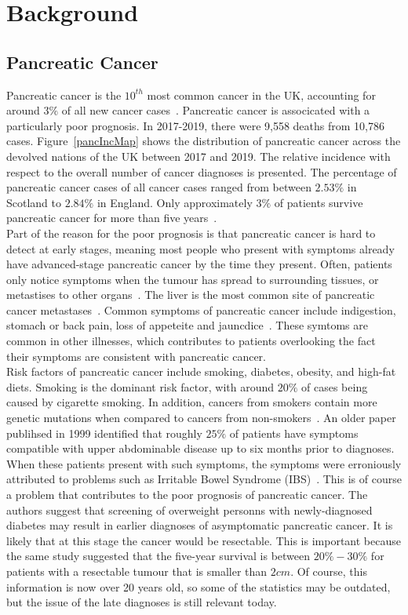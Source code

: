 \chapter{Background}\label{backChap}

\section{Pancreatic Cancer}
Pancreatic cancer is the $10^{th}$ most common cancer in the UK, accounting for around $3\%$ of all new cancer cases~\cite{pancStat}. Pancreatic cancer is associcated with a particularly poor prognosis. In 2017-2019, there were 9,558 deaths from 10,786 cases. Figure~\ref{pancIncMap} shows the distribution of pancreatic cancer across the devolved nations of the UK between 2017 and 2019. The relative incidence with respect to the overall number of cancer diagnoses is presented. The percentage of pancreatic cancer cases of all cancer cases ranged from between $2.53\%$ in Scotland to $2.84\%$ in England. Only approximately $3\%$ of patients survive pancreatic cancer for more than five years~\cite{NG85}.\\

Part of the reason for the poor prognosis is that pancreatic cancer is hard to detect at early stages, meaning most people who present with symptoms already have advanced-stage pancreatic cancer by the time they present. Often, patients only notice symptoms when the tumour has spread to surrounding tissues, or metastises to other organs~\cite{kelsen}. The liver is the most common site of pancreatic cancer metastases~\cite{deeb}. Common symptoms of pancreatic cancer include indigestion, stomach or back pain, loss of appeteite and jauncdice~\cite{pancSymp}. These symtoms are common in other illnesses, which contributes to patients overlooking the fact their symptoms are consistent with pancreatic cancer. \\

Risk factors of pancreatic cancer include smoking, diabetes, obesity, and high-fat diets. Smoking is the dominant risk factor, with around $20\%$ of cases being caused by cigarette smoking. In addition, cancers from smokers contain more genetic mutations when compared to cancers from non-smokers~\cite{blackford}. An older paper publihsed in 1999 identified that roughly $25\%$ of patients have symptoms compatible with upper abdominable disease up to six months prior to diagnoses. When these patients present with such symptoms, the symptoms were erroniously attributed to problems such as Irritable Bowel Syndrome (IBS)~\cite{dimagno}. This is of course a problem that contributes to the poor prognosis of pancreatic cancer. The authors suggest that screening of overweight personns with newly-diagnosed diabetes may result in earlier diagnoses of asymptomatic pancreatic cancer. It is likely that at this stage the cancer would be resectable. This is important because the same study suggested that the five-year survival is between $20\%-30\%$ for patients with a resectable tumour that is smaller than $2cm$. Of course, this information is now over 20 years old, so some of the statistics may be outdated, but the issue of the late diagnoses is still relevant today. \\

